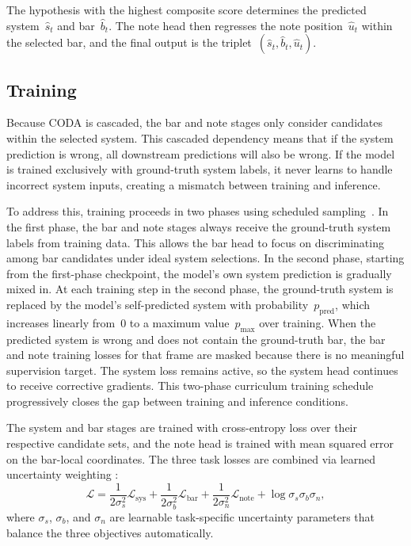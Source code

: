 \documentclass{article}
\begin{document}
The hypothesis with the highest composite score determines the predicted system~$\hat{s}_t$ and bar~$\hat{b}_t$. The note head then regresses the note position~$\hat{u}_t$ within the selected bar, and the final output is the triplet~$(\hat{s}_t, \hat{b}_t, \hat{u}_t)$.

\subsection{Training}

Because CODA is cascaded, the bar and note stages only consider candidates within the selected system. This cascaded dependency means that if the system prediction is wrong, all downstream predictions will also be wrong. If the model is trained exclusively with ground-truth system labels, it never learns to handle incorrect system inputs, creating a mismatch between training and inference.

To address this, training proceeds in two phases using scheduled sampling~\cite{bengio2015scheduled}. In the first phase, the bar and note stages always receive the ground-truth system labels from training data. This allows the bar head to focus on discriminating among bar candidates under ideal system selections. In the second phase, starting from the first-phase checkpoint, the model's own system prediction is gradually mixed in. At each training step in the second phase, the ground-truth system is replaced by the model's self-predicted system with probability~$p_{\mathrm{pred}}$, which increases linearly from~0 to a maximum value~$p_{\max}$ over training. When the predicted system is wrong and does not contain the ground-truth bar, the bar and note training losses for that frame are masked because there is no meaningful supervision target. The system loss remains active, so the system head continues to receive corrective gradients. This two-phase curriculum training schedule progressively closes the gap between training and inference conditions.

The system and bar stages are trained with cross-entropy loss over their respective candidate sets, and the note head is trained with mean squared error on the bar-local coordinates. The three task losses are combined via learned uncertainty weighting \cite{kendall2018multi}:
\begin{equation}\label{eq:loss}
\mathcal{L} = \frac{1}{2\sigma_s^2}\mathcal{L}_{\mathrm{sys}} + \frac{1}{2\sigma_b^2}\mathcal{L}_{\mathrm{bar}} + \frac{1}{2\sigma_n^2}\mathcal{L}_{\mathrm{note}} + \log \sigma_s \sigma_b \sigma_n,
\end{equation}
where $\sigma_s$, $\sigma_b$, and $\sigma_n$ are learnable task-specific uncertainty parameters that balance the three objectives automatically.
\end{document}
